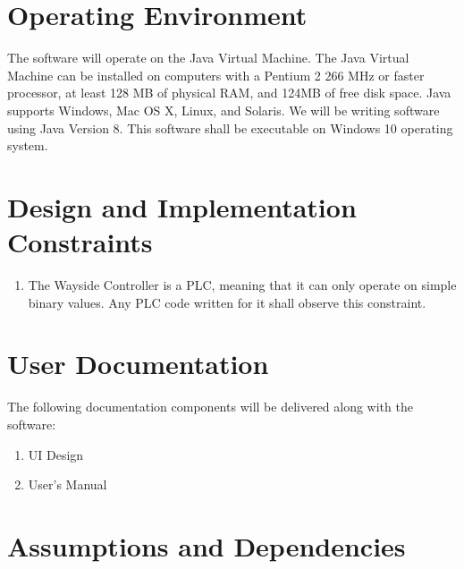 \documentclass{scrreprt}
\begin{document}
\section{Operating Environment}
The software will operate on the Java Virtual Machine. The Java Virtual Machine
can be installed on computers with a Pentium 2 266 MHz or faster processor, at
least 128 MB of physical RAM, and 124MB of free disk space. Java supports Windows,
Mac OS X, Linux, and Solaris. We will be writing software using Java Version 8.
This software shall be executable on Windows 10 operating system.

\section{Design and Implementation Constraints}
\begin{enumerate}
    \item The Wayside Controller is a PLC, meaning that it can only operate on simple binary values. Any PLC code written for it shall observe this constraint.
\end{enumerate}

\section{User Documentation}

The following documentation components will be delivered along with the software:
\begin{enumerate}
    \item UI Design
    \item User's Manual
\end{enumerate}

\section{Assumptions and Dependencies}

\end{document}
